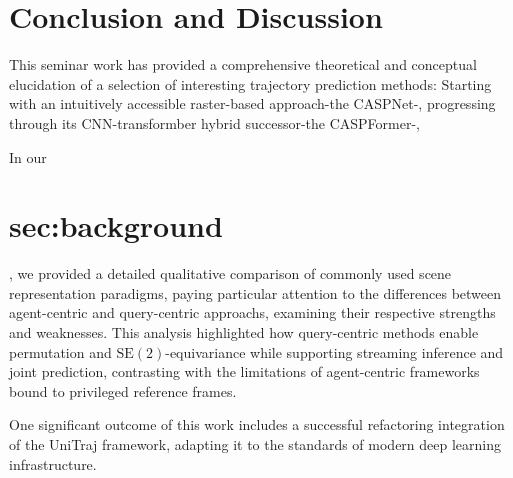 \section{Conclusion and Discussion}
\label{sec:conclusion}

This seminar work has provided a comprehensive theoretical and conceptual elucidation of a selection of interesting trajectory prediction methods: Starting with an intuitively accessible raster-based approach-the CASPNet-, progressing through its CNN-transformber hybrid successor-the CASPFormer-, %

In our \section{sec:background}, we provided a detailed qualitative comparison of commonly used scene representation paradigms, paying particular attention to the differences between agent-centric and query-centric approachs, examining their respective strengths and weaknesses. This analysis highlighted how query-centric methods enable permutation and $\mathrm{SE}(2)$-equivariance while supporting streaming inference and joint prediction, contrasting with the limitations of agent-centric frameworks bound to privileged reference frames.


One significant outcome of this work includes a successful refactoring integration of the UniTraj framework, adapting it to the standards of modern deep learning infrastructure.


